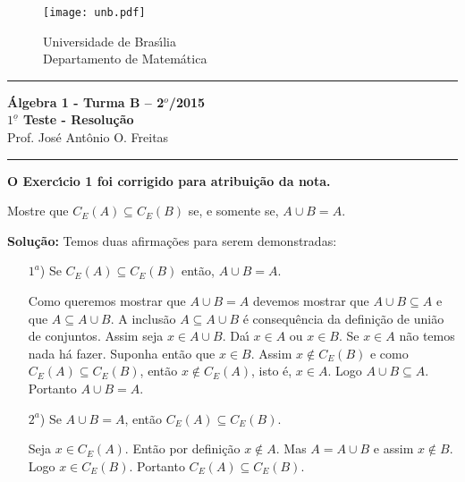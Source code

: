 \documentclass[12pt]{article}
\newcounter{exercicios}
\newcommand{\questao}{
\addtocounter{exercicios}{1}
\noindent{\bf Exerc{\'\i}cio \arabic{exercicios}: }}
\begin{document}
\pagestyle{empty}

\begin{figure}[h]
        \begin{minipage}[c]{1.7cm}
        \texttt{[image: unb.pdf]}
        \end{minipage}%
        \hspace{0pt}
        \begin{minipage}[c]{4in}
          {Universidade de Bras{\'\i}lia} \\
          {Departamento de Matem{\'a}tica}
\end{minipage}
\end{figure}
\vspace{-1cm}\hrule

\begin{center}
{\Large\bf {\'A}lgebra 1 - Turma B -- 2$^{o}$/2015} \\ \vspace{9pt} {\large\bf
  $1^{\underline{o}}$ Teste - Resolu\c{c}\~ao}\\
\vspace{9pt} Prof. Jos{\'e} Ant{\^o}nio O. Freitas
\end{center}
\hrule

\vspace{.6cm}

\textbf{O Exerc{\'\i}cio 1 foi corrigido para atribui\c{c}\~ao da nota.}

\vspace{.6cm}

\questao Mostre que $C_E(A) \subseteq C_E(B)$ se, e somente se, $A \cup B = A$.

\noindent\textbf{Solu\c{c}\~ao:} Temos duas afirma\c{c}\~oes para serem demonstradas:
\begin{enumerate}
	\item[$1^a$)] Se $C_E(A) \subseteq C_E(B)$ ent\~ao, $A \cup B = A$.

	Como queremos mostrar que $A \cup B = A$ devemos mostrar que $A \cup B \subseteq A$ e que $A \subseteq A \cup B$. A inclus\~ao $A \subseteq A \cup B$ \'e consequ\^encia da defini\c{c}\~ao de uni\~ao de conjuntos. Assim seja $x \in A \cup B$. Da{\'\i} $x \in A$ ou $x \in B$. Se $x \in A$ n\~ao temos nada h\'a fazer. Suponha ent\~ao que $x \in B$. Assim $x \notin C_E(B)$ e como $C_E(A) \subseteq C_E(B)$, ent\~ao $x \notin C_E(A)$, isto \'e, $x \in A$. Logo $A \cup B \subseteq A$. Portanto $A \cup B = A$.

	\item[$2^a$)] Se $A \cup B = A$, ent\~ao $C_E(A) \subseteq C_E(B)$.

	Seja $x \in C_E(A)$. Ent\~ao por defini\c{c}\~ao $x \notin A$. Mas $A = A \cup B$ e assim $x \notin B$. Logo $x \in C_E(B)$. Portanto $C_E(A) \subseteq C_E(B)$.
\end{enumerate}
\end{document}

